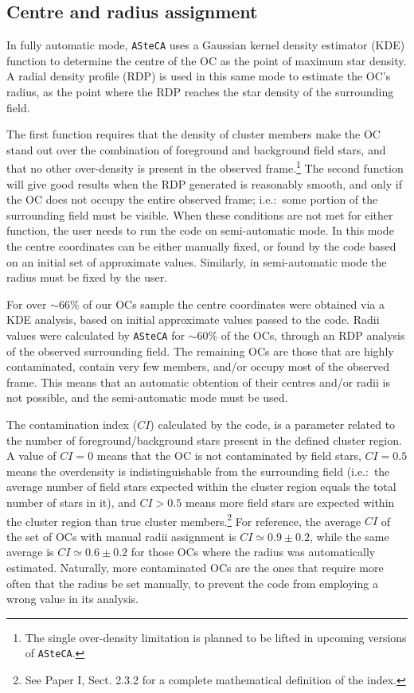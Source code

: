 \documentclass[a4paper,fleqn,usenatbib]{mnras}
\begin{document}

\subsection{Centre and radius assignment}
\label{ssec:centre-radius}

In fully automatic mode, \texttt{ASteCA} uses a Gaussian kernel density
estimator (KDE) function to determine the centre of the OC as the point of
maximum star density.
A radial density profile (RDP) is used in this same mode to estimate
the OC's radius, as the point where the RDP reaches the star density of the
surrounding field.

The first function requires that the density of cluster members make the
OC stand out over the combination of foreground and background field stars, and
that no other over-density is present in the observed frame.\footnote{The single
over-density limitation is planned to be lifted in upcoming versions of
\texttt{ASteCA}.}
The second function will give good results when the RDP generated is reasonably
smooth, and only if the OC does not occupy the entire observed frame; i.e.:\
some portion of the surrounding field must be visible.
%
When these conditions are not met for either function, the user needs to run
the code on semi-automatic mode. In this mode the centre coordinates can be
either manually fixed, or found by the code based on an initial set of
approximate values. Similarly, in semi-automatic mode the radius must be fixed
by the user.

For over $\sim66\%$ of our OCs sample the centre coordinates were obtained
via a KDE analysis, based on initial approximate values passed to
the code.
Radii values were calculated by \texttt{ASteCA} for $\sim60\%$ of the OCs,
through an RDP analysis of the observed surrounding field.
%
The remaining OCs are those that are highly contaminated, contain very
few members, and/or occupy most of the observed frame. This means that an
automatic obtention of their centres and/or radii is not possible, and the
semi-automatic mode must be used.

The contamination index ($CI$) calculated by the code, is a parameter related to
the number of foreground/background stars present in the defined cluster region.
A value of $CI{=}0$ means that the OC is not contaminated by field stars,
$CI{=}0.5$ means the overdensity is indistinguishable from the surrounding
field (i.e.:\ the average number of field stars expected within the cluster
region equals the total number of stars in it), and $CI{>}0.5$ means more field
stars are expected within the cluster region than true cluster
members.\footnote{See Paper I, Sect. 2.3.2 for a complete mathematical
definition of the index.}
%
For reference, the average $CI$ of the set of OCs with manual radii assignment
is $CI{\simeq}0.9\pm0.2$, while the same average is $CI{\simeq}0.6\pm0.2$ for
those OCs where the radius was automatically estimated. Naturally, more
contaminated OCs are the ones that require more often that the radius be set
manually, to prevent the code from employing a wrong value in its analysis.
\end{document}
